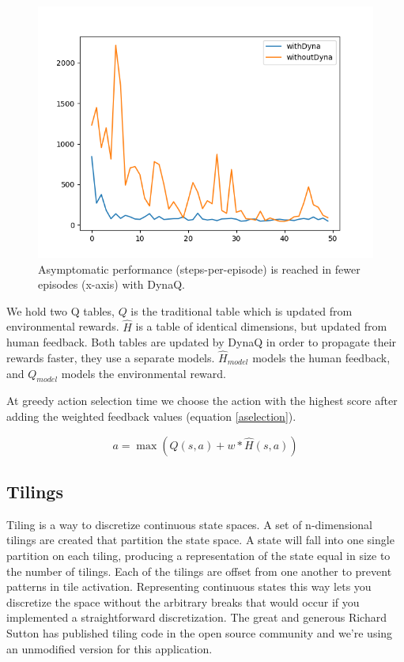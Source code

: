 \documentclass{article}
\begin{document}
\begin{figure}[t]
  \centering
    \includegraphics[width=\linewidth]{episodicComparison-5experiments-50episodes.png}
\caption{Asymptomatic performance (steps-per-episode) is reached in fewer episodes (x-axis) with DynaQ.}
\label{fig:dyna}
\end{figure}

We hold two Q tables, $Q$ is the traditional table which is updated from environmental rewards. $\hat{H}$ is a table of identical dimensions, but updated from human feedback. Both tables are updated by DynaQ in order to propagate their rewards faster, they use a separate models. $\hat{H}_{model}$ models the human feedback, and $Q_{model}$ models the environmental reward. 

At greedy action selection time we choose the action with the highest score after adding the weighted feedback values (equation \ref{aselection}).

\begin{equation}\label{aselection}
  a = \max(Q(s,a) + w * \hat{H}(s,a))
\end{equation}

\subsection{Tilings}

Tiling is a way to discretize continuous state spaces. A set of n-dimensional tilings are created that partition the state space. A state will fall into one single partition on each tiling, producing a representation of the state equal in size to the number of tilings. Each of the tilings are offset from one another to prevent patterns in tile activation. Representing continuous states this way lets you discretize the space without the arbitrary breaks that would occur if you implemented a straightforward discretization. The great and generous Richard Sutton has published tiling code in the open source community \cite{sutton_tile_nodate} and we're using an unmodified version for this application. 
\end{document}
